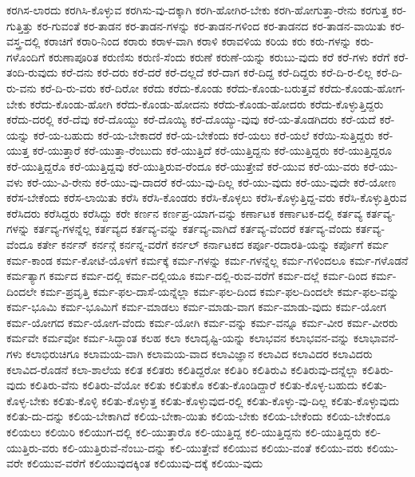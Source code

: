 {ಕರಗಿಸ-ಲಾರದು
ಕರಗಿಸಿ-ಕೊಳ್ಳುವ
ಕರಗಿಸು-ವು-ದಕ್ಕಾಗಿ
ಕರಗಿ-ಹೋಗಿರ-ಬೇಕು
ಕರಗಿ-ಹೋಗುತ್ತಾ-ರೇನು
ಕರಗುತ್ತ
ಕರ-ಗುತ್ತಿತ್ತು
ಕರ-ಗುವಂತೆ
ಕರ-ತಾಡನ
ಕರ-ತಾಡನ-ಗಳನ್ನು
ಕರ-ತಾಡನ-ಗಳಿಂದ
ಕರ-ತಾಡನದ
ಕರ-ತಾಡನ-ವಾಯಿತು
ಕರ-ವಸ್ತ್ರ-ದಲ್ಲಿ
ಕರಾಚಿಗೆ
ಕರಾರಿ-ನಿಂದ
ಕರಾರು
ಕರಾಳ-ವಾಗಿ
ಕರಾಳಿ
ಕರಾವಳಿಯ
ಕರಿಯ
ಕರು
ಕರು-ಗಳನ್ನು
ಕರು-ಗಳೊಂದಿಗೆ
ಕರುಣಾಪೂರಿತ
ಕರುಣಿಸು
ಕರುಣಿ-ಸೆಂದು
ಕರುಣೆ
ಕರುಣೆ-ಯನ್ನು
ಕರುಬು-ವುದು
ಕರೆ
ಕರೆ-ಗಳು
ಕರೆಗೆ
ಕರೆ-ತಂದಿ-ರುವುದು
ಕರೆ-ದನು
ಕರೆ-ದರು
ಕರೆ-ದರೆ
ಕರೆ-ದಲ್ಲದೆ
ಕರೆ-ದಾಗ
ಕರೆ-ದಿದ್ದ
ಕರೆ-ದಿದ್ದರು
ಕರೆ-ದಿ-ರ-ಲಿಲ್ಲ
ಕರೆ-ದಿ-ರು-ವನು
ಕರೆ-ದಿ-ರು-ವರು
ಕರೆ-ದಿರೋ
ಕರೆದು
ಕರೆದು-ಕೊಂಡು
ಕರೆದು-ಕೊಂಡು-ಬರುತ್ತವೆ
ಕರೆದು-ಕೊಂಡು-ಹೋಗ-ಬೇಕು
ಕರೆದು-ಕೊಂಡು-ಹೋಗಿ
ಕರೆದು-ಕೊಂಡು-ಹೋದನು
ಕರೆದು-ಕೊಂಡು-ಹೋದರು
ಕರೆದು-ಕೊಳ್ಳುತ್ತಿದ್ದರು
ಕರೆದು-ದರಲ್ಲಿ
ಕರೆ-ದೆವು
ಕರೆ-ದೊಯ್ದು
ಕರೆ-ದೊಯ್ಯಿ
ಕರೆ-ದೊಯ್ಯು-ವುವು
ಕರೆ-ಯ-ತೊಡಗಿದರು
ಕರೆ-ಯದೆ
ಕರೆ-ಯನ್ನು
ಕರೆ-ಯ-ಬಹುದು
ಕರೆ-ಯ-ಬೇಕಾದರೆ
ಕರೆ-ಯ-ಬೇಕೆಂದು
ಕರೆ-ಯಲು
ಕರೆ-ಯಲೆ
ಕರೆಯಿ-ಸುತ್ತಿದ್ದರು
ಕರೆ-ಯುತ್ತ
ಕರೆ-ಯುತ್ತಾರೆ
ಕರೆ-ಯುತ್ತಾ-ರೆಂಬುದು
ಕರೆ-ಯುತ್ತಿದೆ
ಕರೆ-ಯುತ್ತಿದ್ದನು
ಕರೆ-ಯುತ್ತಿದ್ದರು
ಕರೆ-ಯುತ್ತಿದ್ದರೂ
ಕರೆ-ಯುತ್ತಿದ್ದರೊ
ಕರೆ-ಯುತ್ತಿದ್ದವು
ಕರೆ-ಯುತ್ತಿರುವ-ರೆಂದೂ
ಕರೆ-ಯುತ್ತೇವೆ
ಕರೆ-ಯುವ
ಕರೆ-ಯು-ವರು
ಕರೆ-ಯು-ವಳು
ಕರೆ-ಯು-ವಿ-ರೇನು
ಕರೆ-ಯು-ವು-ದಾದರೆ
ಕರೆ-ಯು-ವು-ದಿಲ್ಲ
ಕರೆ-ಯು-ವುದು
ಕರೆ-ಯು-ವುದೇ
ಕರೆ-ಯೋಣ
ಕರೆಸ-ಬೇಕೆಂದು
ಕರೆಸ-ಲಾಯಿತು
ಕರೆಸಿ
ಕರೆಸಿ-ಕೊಂಡರು
ಕರೆಸಿ-ಕೊಳ್ಳಲು
ಕರೆಸಿ-ಕೊಳ್ಳುತ್ತಿದ್ದ-ವರು
ಕರೆಸಿ-ಕೊಳ್ಳುತ್ತಿರುವ
ಕರೆಸಿದರು
ಕರೆಸಿದ್ದರು
ಕರೆಸಿದ್ದು
ಕರೇ
ಕರ್ಣನ
ಕರ್ಣಪ್ರ-ಯಾಗ-ವನ್ನು
ಕರ್ಣಾಟಕ
ಕರ್ಣಾಟಕ-ದಲ್ಲಿ
ಕರ್ತವ್ಯ
ಕರ್ತವ್ಯ-ಗಳನ್ನು
ಕರ್ತವ್ಯ-ಗಳನ್ನೆಲ್ಲ
ಕರ್ತವ್ಯದ
ಕರ್ತವ್ಯ-ವನ್ನು
ಕರ್ತವ್ಯ-ವಾಗಿದೆ
ಕರ್ತವ್ಯ-ವೆಂದರೆ
ಕರ್ತವ್ಯ-ವೆಂದು
ಕರ್ತವ್ಯ-ವೆಂದೂ
ಕರ್ತೇ
ಕರ್ನನ್
ಕರ್ನನ್ಗೆ
ಕರ್ನನ್ನ-ವರೆಗೆ
ಕರ್ನಲ್
ಕರ್ನಾಟಕದ
ಕರ್ಪೂ-ರದಾರತಿ-ಯನ್ನು
ಕರ್ಪೊಗೆ
ಕರ್ಮ
ಕರ್ಮ-ಕಾಂಡ
ಕರ್ಮ-ಕೋಟೆ-ಯೊಳಗೆ
ಕರ್ಮಕ್ಕೆ
ಕರ್ಮ-ಗಳನ್ನು
ಕರ್ಮ-ಗಳನ್ನೆಲ್ಲ
ಕರ್ಮ-ಗಳಿಂದಲೂ
ಕರ್ಮ-ಗಳೊಡನೆ
ಕರ್ಮತ್ಯಾಗ
ಕರ್ಮದ
ಕರ್ಮ-ದಲ್ಲಿ
ಕರ್ಮ-ದಲ್ಲಿಯೂ
ಕರ್ಮ-ದಲ್ಲಿ-ರುವ-ವರೆಗೆ
ಕರ್ಮ-ದಲ್ಲೆ
ಕರ್ಮ-ದಿಂದ
ಕರ್ಮ-ದಿಂದಲೇ
ಕರ್ಮ-ಪ್ರವೃತ್ತಿ
ಕರ್ಮ-ಫಲ-ದಾಸೆ-ಯನ್ನೆಲ್ಲಾ
ಕರ್ಮ-ಫಲ-ದಿಂದ
ಕರ್ಮ-ಫಲ-ದಿಂದಲೇ
ಕರ್ಮ-ಫಲ-ವನ್ನು
ಕರ್ಮ-ಭೂಮಿ
ಕರ್ಮ-ಭೂಮಿಗೆ
ಕರ್ಮ-ಮಾಡಲು
ಕರ್ಮ-ಮಾಡು-ವಾಗ
ಕರ್ಮ-ಮಾಡು-ವುದು
ಕರ್ಮ-ಯೋಗ
ಕರ್ಮ-ಯೋಗದ
ಕರ್ಮ-ಯೋಗ-ವೆಂದು
ಕರ್ಮ-ಯೋಗಿ
ಕರ್ಮ-ವನ್ನು
ಕರ್ಮ-ವನ್ನೂ
ಕರ್ಮ-ವೀರ
ಕರ್ಮ-ವೀರರು
ಕರ್ಮವೇ
ಕರ್ಮವೋ
ಕರ್ಮ-ಸಿದ್ಧಾಂತ
ಕಲಹ
ಕಲಾ
ಕಲಾದೃಷ್ಟಿ-ಯನ್ನು
ಕಲಾಭವನ
ಕಲಾಭವನ-ವನ್ನು
ಕಲಾಭಾವನೆ-ಗಳು
ಕಲಾಭಿರುಚಿಗೂ
ಕಲಾಮಯ-ವಾಗಿ
ಕಲಾಮಯ-ವಾದ
ಕಲಾವಿಜ್ಞಾನ
ಕಲಾವಿದ
ಕಲಾವಿದರ
ಕಲಾವಿದರು
ಕಲಾವಿದ-ರೊಡನೆ
ಕಲಾ-ಶಾಲೆಯ
ಕಲಿತ
ಕಲಿತರು
ಕಲಿತಿದ್ದರೋ
ಕಲಿತಿರಿ
ಕಲಿತಿರುವಿ
ಕಲಿತಿರುವು-ದನ್ನೆಲ್ಲಾ
ಕಲಿತಿರು-ವುದು
ಕಲಿತಿರು-ವೆನು
ಕಲಿತಿರು-ವೆಯೋ
ಕಲಿತು
ಕಲಿತುಕೊ
ಕಲಿತು-ಕೊಂಡಿದ್ದಾರೆ
ಕಲಿತು-ಕೊಳ್ಳ-ಬಹುದು
ಕಲಿತು-ಕೊಳ್ಳ-ಬೇಕು
ಕಲಿತು-ಕೊಳ್ಳಿ
ಕಲಿತು-ಕೊಳ್ಳುತ್ತ
ಕಲಿತು-ಕೊಳ್ಳುವುದ-ರಲ್ಲಿ
ಕಲಿತು-ಕೊಳ್ಳು-ವು-ದಿಲ್ಲ
ಕಲಿತು-ಕೊಳ್ಳುವುದು
ಕಲಿತು-ದು-ದನ್ನು
ಕಲಿಯ-ಬೇಕಾಗಿದೆ
ಕಲಿಯ-ಬೇಕಾ-ಯಿತು
ಕಲಿಯ-ಬೇಕು
ಕಲಿಯ-ಬೇಕೆಂದು
ಕಲಿಯ-ಬೇಕೆಂದೂ
ಕಲಿಯಲು
ಕಲಿಯಿರಿ
ಕಲಿಯುಗ-ದಲ್ಲಿ
ಕಲಿ-ಯುತ್ತಾರೊ
ಕಲಿ-ಯುತ್ತಿದ್ದ
ಕಲಿ-ಯುತ್ತಿದ್ದನು
ಕಲಿ-ಯುತ್ತಿದ್ದರು
ಕಲಿ-ಯುತ್ತಿರು-ವರು
ಕಲಿ-ಯುತ್ತಿರುವೆ-ನೆಂಬು-ದನ್ನು
ಕಲಿ-ಯುತ್ತೇವೆ
ಕಲಿಯುವ
ಕಲಿಯು-ವಂತೆ
ಕಲಿಯು-ವರು
ಕಲಿಯು-ವರೇ
ಕಲಿಯುವ-ವರೆಗೆ
ಕಲಿಯುವುದಕ್ಕಿಂತ
ಕಲಿಯುವು-ದಕ್ಕೆ
ಕಲಿಯು-ವುದು
}
